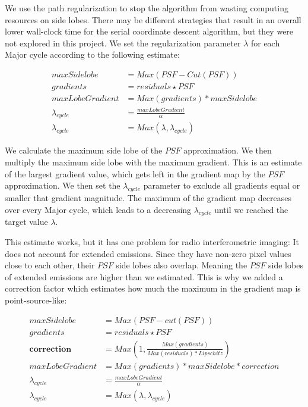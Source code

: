 We use the path regularization to stop the algorithm from wasting computing resources on side lobes. There may be different strategies that result in an overall lower wall-clock time for the serial coordinate descent algorithm, but they were not explored in this project. We set the regularization parameter $\lambda$ for each Major cycle according to the following estimate:

\begin{equation}
\begin{split}
maxSidelobe &= Max(PSF - Cut(PSF)) \\
gradients &= residuals \star PSF \\
maxLobeGradient &= Max(gradients) * maxSidelobe \\
\lambda_{cycle} &= \frac{maxLobeGradient}{\alpha}\\
\lambda_{cycle} &= Max(\lambda, \lambda_{cycle})
\end{split}
\end{equation}

We calculate the maximum side lobe of the $PSF$ approximation. We then multiply the maximum side lobe with the maximum gradient. This is an estimate of the largest gradient value, which gets left in the gradient map by the $PSF$ approximation. We then set the $\lambda_{cycle}$ parameter to exclude all gradients equal or smaller that gradient magnitude. The maximum of the gradient map decreases over every Major cycle, which leads to a decreasing $\lambda_{cycle}$ until we reached the target value $\lambda$.

This estimate works, but it has one problem for radio interferometric imaging: It does not account for extended emissions. Since they have non-zero pixel values close to each other, their $PSF$ side lobes also overlap. Meaning the $PSF$ side lobes of extended emissions are higher than we estimated. This is why we added a correction factor which estimates how much the maximum in the gradient map is point-source-like:

\begin{equation}
\begin{split}
maxSidelobe &= Max(PSF - cut(PSF)) \\
gradients &= residuals \star PSF \\
\textbf{correction} &= Max(1, \frac{Max(gradients)}{Max(residuals) * Lipschitz}) \\
maxLobeGradient &= Max(gradients) * maxSidelobe * correction \\
\lambda_{cycle} &= \frac{maxLobeGradient}{\alpha}\\
\lambda_{cycle} &= Max(\lambda, \lambda_{cycle})
\end{split}
\end{equation}

